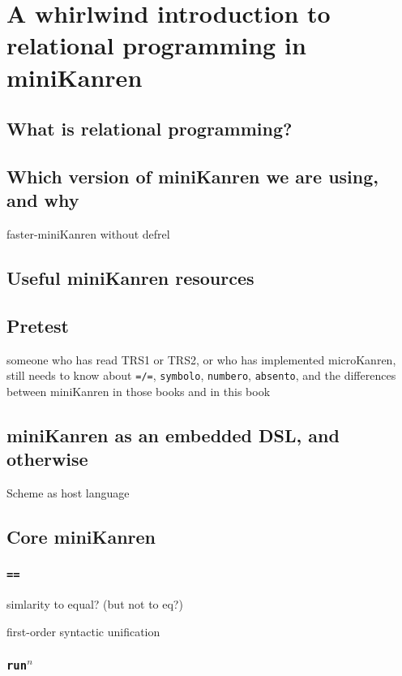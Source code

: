 \documentclass{book}
\begin{document}
\chapter{A whirlwind introduction to relational programming in miniKanren}%

\section{What is relational programming?}

\section{Which version of miniKanren we are using, and why}

faster-miniKanren without defrel

\section{Useful miniKanren resources}

\section{Pretest}

someone who has read TRS1 or TRS2, or who has implemented microKanren,
still needs to know about \texttt{=/=}, \texttt{symbolo},
\texttt{numbero}, \texttt{absento}, and the differences between
miniKanren in those books and in this book

\section{miniKanren as an embedded DSL, and otherwise}

Scheme as host language

\section{Core miniKanren}

\subsection{\texttt{==}}

simlarity to equal? (but not to eq?)

first-order syntactic unification

\subsection{\texttt{run}$^{n}$}
\end{document}
